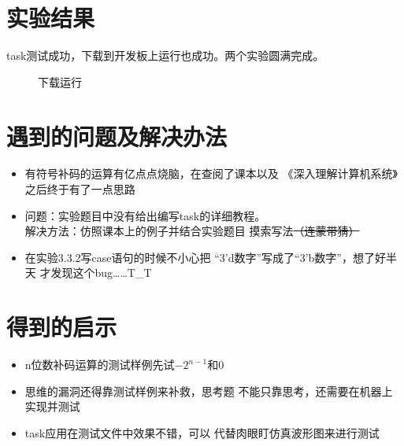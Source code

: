 \documentclass[12pt,a4paper,UTF8]{article}
\begin{document}
\section{实验结果}
task测试成功，下载到开发板上运行也成功。两个实验圆满完成。
\begin{figure}[H]
  \centering
  \caption{下载运行}
  \label{fpga}
\end{figure}

\section{遇到的问题及解决办法}
\begin{itemize}
  \item 有符号补码的运算有亿点点烧脑，在查阅了课本以及
        《深入理解计算机系统》之后终于有了一点思路
  \item 问题：实验题目中没有给出编写task的详细教程。\\
        解决方法：仿照课本上的例子并结合实验题目
        摸索写法\sout{（连蒙带猜）}
  \item 在实验3.3.2写case语句的时候不小心把
        ``3'd数字''写成了``3'b数字''，想了好半天
        才发现这个bug……T\_T
\end{itemize}

\section{得到的启示}
\begin{itemize}
  \item n位数补码运算的测试样例先试$-2^{n-1}$和0
  \item 思维的漏洞还得靠测试样例来补救，思考题
        不能只靠思考，还需要在机器上实现并测试
  \item task应用在测试文件中效果不错，可以
        代替肉眼盯仿真波形图来进行测试
\end{itemize}
\end{document}
